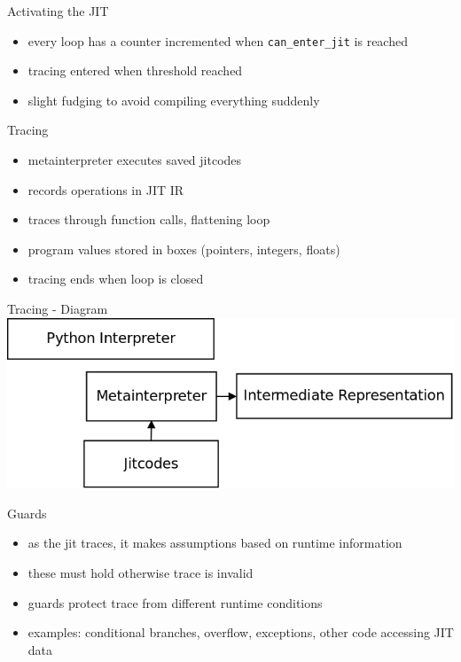\documentclass[14pt]{beamer}
\begin{document}
\begin{frame}[fragile]{Activating the JIT}
\begin{itemize}
\item every loop has a counter incremented when \verb+can_enter_jit+ is reached
\item tracing entered when threshold reached
\item slight fudging to avoid compiling everything suddenly
\end{itemize}
\end{frame}

\begin{frame}{Tracing}
\begin{itemize}
\item metainterpreter executes saved jitcodes
\item records operations in JIT IR
\item traces through function calls, flattening loop
\item program values stored in boxes (pointers, integers, floats)
\item tracing ends when loop is closed
\end{itemize}
\end{frame}

\begin{frame}{Tracing - Diagram}
\includegraphics[scale=.30]{tracing.png}
\end{frame}

\begin{frame}{Guards}
\begin{itemize}
\item as the jit traces, it makes assumptions based on runtime information
\item these must hold otherwise trace is invalid
\item guards protect trace from different runtime conditions
\item examples: conditional branches, overflow, exceptions, other code accessing JIT data
\end{itemize}
\end{frame}
\end{document}

